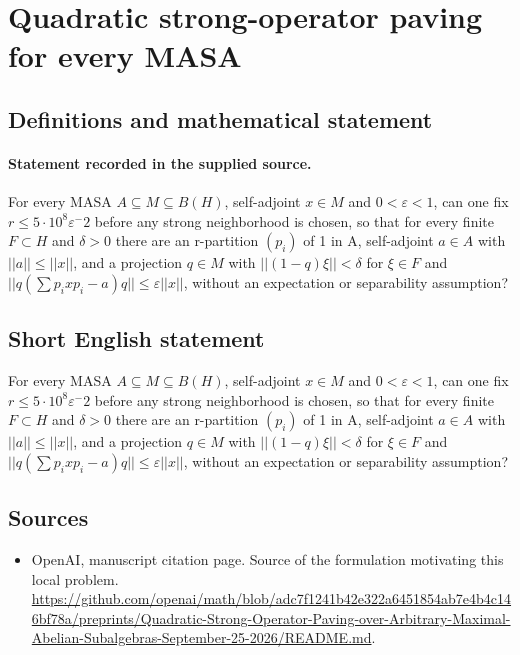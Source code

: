 \documentclass[11pt]{article}
\begin{document}
\section*{Quadratic strong-operator paving for every MASA}\label{30007296}
\subsection{Definitions and mathematical statement}
\paragraph{Statement recorded in the supplied source.}
For every MASA $A\subseteq M\subseteq B(H)$, self-adjoint $x\in M$ and $0<\varepsilon <1$, can one fix $r\leq 5\cdot 10^{8}\varepsilon ^-2$ before any strong neighborhood is chosen, so that for every finite $F\subset H$ and $\delta >0$ there are an r-partition $(p_i)$ of 1 in A, self-adjoint $a\in A$ with $||a||\leq ||x||$, and a projection $q\in M$ with $||(1-q)\xi ||<\delta $ for $\xi \in F$ and $||q(\sum p_ixp_i-a)q||\leq \varepsilon ||x||$, without an expectation or separability assumption?
\subsection{Short English statement}
For every MASA $A\subseteq M\subseteq B(H)$, self-adjoint $x\in M$ and $0<\varepsilon <1$, can one fix $r\leq 5\cdot 10^{8}\varepsilon ^-2$ before any strong neighborhood is chosen, so that for every finite $F\subset H$ and $\delta >0$ there are an r-partition $(p_i)$ of 1 in A, self-adjoint $a\in A$ with $||a||\leq ||x||$, and a projection $q\in M$ with $||(1-q)\xi ||<\delta $ for $\xi \in F$ and $||q(\sum p_ixp_i-a)q||\leq \varepsilon ||x||$, without an expectation or separability assumption?
\subsection{Sources}
\begin{itemize}
\item[S1] OpenAI, manuscript citation page. Source of the formulation motivating this local problem.
\url{https://github.com/openai/math/blob/adc7f1241b42e322a6451854ab7e4b4c146bf78a/preprints/Quadratic-Strong-Operator-Paving-over-Arbitrary-Maximal-Abelian-Subalgebras-September-25-2026/README.md}.
\end{itemize}
\end{document}
